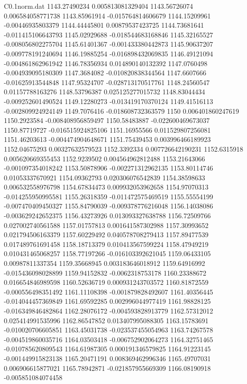 \begin{filecontents}{C0.1norm.dat}
1143.27490234		0.005813081329404
1143.56726074		0.006584058771738
1143.85961914		-0.015764814606679
1144.15209961		-0.00446935803379
1144.44445801		0.00879537423725
1144.73681641		-0.011415106643793
1145.02929688		-0.018544683168846
1145.32165527		-0.008056802275704
1145.61401367		-0.001433380442873
1145.90637207		-0.009778191240694
1146.19885254		-0.016898432069835
1146.49121094		-0.004861862961942
1146.78356934		0.014890140132392
1147.0760498		-0.004939095180309
1147.3684082		-0.010820838344564
1147.6607666		-0.01625913544848
1147.95324707		-0.028713170517761
1148.24560547		0.01157788163276
1148.53796387		0.025125277015732
1148.83044434		-0.009252601490524
1149.12280273		-0.013419170370124
1149.41516113		-0.002809924924149
1149.7076416		-0.018608732363579
1150		0.006401860247619
1150.2923584		-0.008408956859497
1150.58483887		-0.022600469673037
1150.87719727		-0.016515924825106
1151.16955566		0.011529807256081
1151.46203613		-0.004474904648671
1151.75439453		0.003996466189923
1152.04675293		0.00327632579523
1152.3392334		0.007726642190231
1152.6315918		0.005620669355453
1152.9239502		0.004564962812488
1153.21643066		-0.001097354018242
1153.50878906		-0.002271312962135
1153.80114746		0.01053337670921
1154.09362793		0.020306076542839
1154.38598633		0.006532558976798
1154.67834473		0.009932053962658
1154.97070313		-0.014255950995581
1155.26318359		-0.011472575469519
1155.55554199		-0.007470409450327
1155.84790039		-0.009378776216048
1156.14038086		-0.003629242652375
1156.43273926		0.013093327638788
1156.72509766		0.027002740561588
1157.01757813		0.001641587302988
1157.30993652		0.021794506163379
1157.60229492		0.040578708279413
1157.89477539		0.017489761691458
1158.18713379		0.010413567599224
1158.47949219		0.010431465068257
1158.77197266		-0.016103392621045
1159.06433105		0.00987811337354
1159.35668945		0.003183646018912
1159.64916992		-0.015436098028899
1159.94152832		-0.0062318753178
1160.23388672		0.016654846989598
1160.52636719		0.000931243703572
1160.81872559		-0.000556498351492
1161.11108398		-0.001879828492607
1161.40356445		-0.014044457369849
1161.69592285		0.002996044977419
1161.98828125		-0.016349846482864
1162.28076172		-0.004593828913779
1162.57312012		0.025414991535996
1162.86547852		0.013407995088305
1163.15783691		-0.010020706605851
1163.45031738		-0.023537455054963
1163.74267578		-0.004519860035716
1164.03503418		-0.006752902064273
1164.32751465		-0.010785620809543
1164.61987305		0.000191346579825
1164.91223145		-0.001449915823138
1165.20471191		0.008369462996346
1165.49707031		0.006906615877021
1165.78942871		-0.021857955669309
1166.08190918		-0.005851084074458

\end{filecontents}
